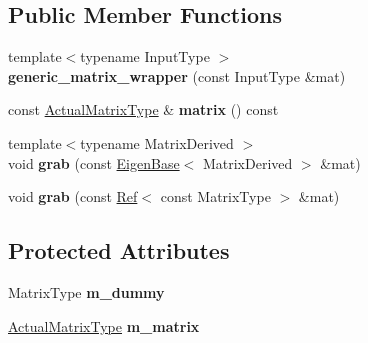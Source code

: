 \subsection*{Public Member Functions}
\begin{DoxyCompactItemize}
\item 
\mbox{\label{class_eigen_1_1internal_1_1generic__matrix__wrapper_3_01_matrix_type_00_01false_01_4_a4f7f5c24c811dcab5bacb54ba56fba61}} 
{\footnotesize template$<$typename Input\+Type $>$ }\\{\bfseries generic\+\_\+matrix\+\_\+wrapper} (const Input\+Type \&mat)
\item 
\mbox{\label{class_eigen_1_1internal_1_1generic__matrix__wrapper_3_01_matrix_type_00_01false_01_4_ad5b06fe81d4917ee5b4ab2f979a7d8d1}} 
const \mbox{\hyperlink{class_eigen_1_1_ref}{Actual\+Matrix\+Type}} \& {\bfseries matrix} () const
\item 
\mbox{\label{class_eigen_1_1internal_1_1generic__matrix__wrapper_3_01_matrix_type_00_01false_01_4_a8991aa3e56b8d58b3ffefac71c0bf957}} 
{\footnotesize template$<$typename Matrix\+Derived $>$ }\\void {\bfseries grab} (const \mbox{\hyperlink{struct_eigen_1_1_eigen_base}{Eigen\+Base}}$<$ Matrix\+Derived $>$ \&mat)
\item 
\mbox{\label{class_eigen_1_1internal_1_1generic__matrix__wrapper_3_01_matrix_type_00_01false_01_4_aa20affa5a6099a01f9298ce7f179339b}} 
void {\bfseries grab} (const \mbox{\hyperlink{class_eigen_1_1_ref}{Ref}}$<$ const Matrix\+Type $>$ \&mat)
\end{DoxyCompactItemize}
\subsection*{Protected Attributes}
\begin{DoxyCompactItemize}
\item 
\mbox{\label{class_eigen_1_1internal_1_1generic__matrix__wrapper_3_01_matrix_type_00_01false_01_4_a946f17150cf60c23562b6bbf7c864f86}} 
Matrix\+Type {\bfseries m\+\_\+dummy}
\item 
\mbox{\label{class_eigen_1_1internal_1_1generic__matrix__wrapper_3_01_matrix_type_00_01false_01_4_af8190764736b3b5520dd98ecf091ef50}} 
\mbox{\hyperlink{class_eigen_1_1_ref}{Actual\+Matrix\+Type}} {\bfseries m\+\_\+matrix}
\end{DoxyCompactItemize}


